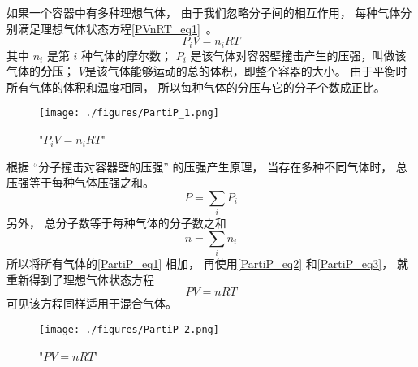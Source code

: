 

如果一个容器中有多种理想气体， 由于我们忽略分子间的相互作用， 每种气体分别满足理想气体状态方程\autoref{PVnRT_eq1}~。
\begin{equation}\label{PartiP_eq1}
P_i V = n_i R T
\end{equation}
其中 $n_i$ 是第 $i$ 种气体的摩尔数； $P_i$ 是该气体对容器壁撞击产生的压强，叫做该气体的\textbf{分压}； $V$是该气体能够运动的总的体积，即整个容器的大小。 由于平衡时所有气体的体积和温度相同， 所以每种气体的分压与它的分子个数成正比。

\begin{figure}[ht]
\centering
\texttt{[image: ./figures/PartiP\_1.png]}
\caption{"$P_i V = n_i R T$"} \label{PartiP_fig1}
\end{figure}

根据 “分子撞击对容器壁的压强” 的压强产生原理， 当存在多种不同气体时， 总压强等于每种气体压强之和。
\begin{equation}\label{PartiP_eq2}
P = \sum_i P_i
\end{equation}
另外， 总分子数等于每种气体的分子数之和
\begin{equation}\label{PartiP_eq3}
n = \sum_i n_i
\end{equation}
所以将所有气体的\autoref{PartiP_eq1} 相加， 再使用\autoref{PartiP_eq2} 和\autoref{PartiP_eq3}， 就重新得到了理想气体状态方程
\begin{equation}
P V = n RT
\end{equation}
可见该方程同样适用于混合气体。

\begin{figure}[ht]
\centering
\texttt{[image: ./figures/PartiP\_2.png]}
\caption{"$P V = n RT$"} \label{PartiP_fig2}
\end{figure}

